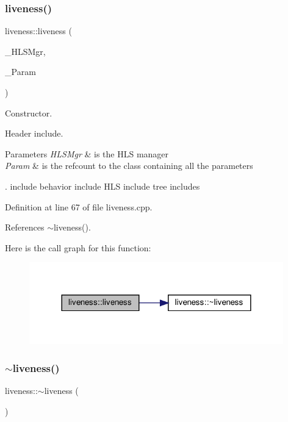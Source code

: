 \subsubsection{\texorpdfstring{liveness()}{liveness()}}
{\footnotesize\ttfamily liveness\+::liveness (\begin{DoxyParamCaption}\item[{const \hyperlink{hls__manager_8hpp_acd3842b8589fe52c08fc0b2fcc813bfe}{H\+L\+S\+\_\+manager\+Ref}}]{\+\_\+\+H\+L\+S\+Mgr,  }\item[{const \hyperlink{Parameter_8hpp_a37841774a6fcb479b597fdf8955eb4ea}{Parameter\+Const\+Ref}}]{\+\_\+\+Param }\end{DoxyParamCaption})}



Constructor. 

Header include.


\begin{DoxyParams}{Parameters}
{\em H\+L\+S\+Mgr} & is the H\+LS manager \\
\hline
{\em Param} & is the refcount to the class containing all the parameters\\
\hline
\end{DoxyParams}
. include behavior include H\+LS include tree includes 

Definition at line 67 of file liveness.\+cpp.



References $\sim$liveness().

Here is the call graph for this function\+:
\nopagebreak
\begin{figure}[H]
\begin{center}
\leavevmode
\includegraphics[width=312pt]{d3/d1f/classliveness_a6b677572ebda4ba84035251bf3e8353b_cgraph}
\end{center}
\end{figure}
\mbox{\label{classliveness_ad99bfcdba90d09aabd32a65e79d05f36}} 
\subsubsection{\texorpdfstring{$\sim$liveness()}{~liveness()}}
{\footnotesize\ttfamily liveness\+::$\sim$liveness (\begin{DoxyParamCaption}{ }\end{DoxyParamCaption})\hspace{0.3cm}{\ttfamily [default]}}



